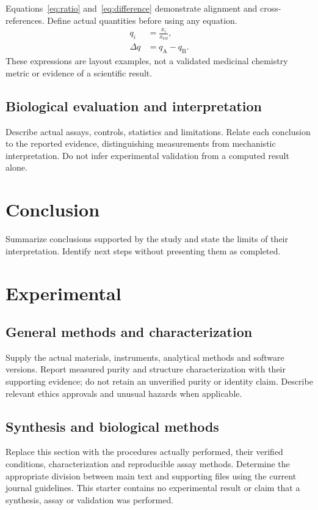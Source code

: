 \documentclass[a4paper,preprint,12pt]{elsarticle}
\begin{document}
Equations~\eqref{eq:ratio} and~\eqref{eq:difference} demonstrate alignment
and cross-references. Define actual quantities before using any equation.
\begin{align}
 q_i &= \frac{x_i}{x_{\mathrm{ref}}},\label{eq:ratio}\\
 \Delta q &= q_{\mathrm{A}}-q_{\mathrm{B}}.\label{eq:difference}
\end{align}
These expressions are layout examples, not a validated medicinal chemistry
metric or evidence of a scientific result.

\subsection{Biological evaluation and interpretation}\label{sec:biology}
Describe actual assays, controls, statistics and limitations. Relate each
conclusion to the reported evidence, distinguishing measurements from
mechanistic interpretation. Do not infer experimental validation from a
computed result alone.

\section{Conclusion}\label{sec:conclusion}
Summarize conclusions supported by the study and state the limits of their
interpretation. Identify next steps without presenting them as completed.

\section{Experimental}\label{sec:experimental}
\subsection{General methods and characterization}
Supply the actual materials, instruments, analytical methods and software
versions. Report measured purity and structure characterization with their
supporting evidence; do not retain an unverified purity or identity claim.
Describe relevant ethics approvals and unusual hazards when applicable.

\subsection{Synthesis and biological methods}
Replace this section with the procedures actually performed, their verified
conditions, characterization and reproducible assay methods. Determine the
appropriate division between main text and supporting files using the
current journal guidelines. This starter contains no experimental result
or claim that a synthesis, assay or validation was performed.
\end{document}
